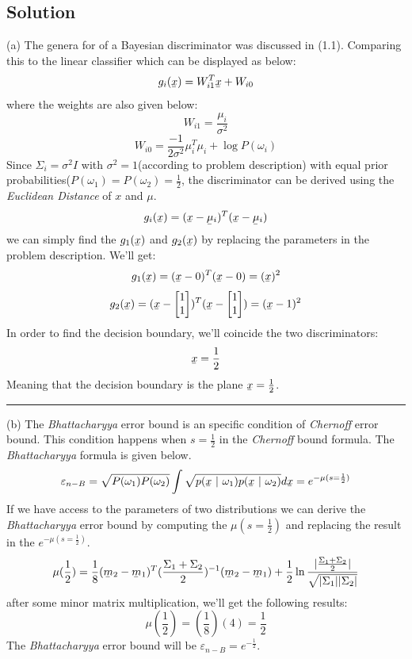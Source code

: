 \documentclass[12pt]{article}
\numberwithin{equation}{section}
\numberwithin{table}{section}
\numberwithin{figure}{section}
\newcommand{\eps}{\varepsilon}
\begin{document}
\subsection*{Solution}
(a) The genera for of a Bayesian discriminator was discussed in (1.1). Comparing this to the linear classifier which can be displayed as below:
$$
	g_i(\underaccent{\bar}{x}) = W_{i1}^T\underaccent{\bar}{x} + W_{i0}
$$
where the weights are also given below:\\
$$
	W_{i1} = \frac{\mu_i}{\sigma^2}
$$
$$
	W_{i0} = \frac{-1}{2\sigma^2}\mu_{i}^T\mu_{i} + \log P(\omega_i)
$$
Since $\Sigma_i = \sigma^2I$ with $\sigma^2 = 1$(according to problem description) with equal prior probabilities($P(\omega_1) = P(\omega_2) = \frac{1}{2}$, the discriminator can be derived using the \textit{Euclidean Distance} of $x$ and $\mu$.
$$
	g_i(\underaccent{\bar}{x}) = (\underaccent{\bar}{x} - \underaccent{\bar}{\mu}_i)^T (\underaccent{\bar}{x} - \underaccent{\bar}{\mu}_i)
$$
we can simply find the $g_1(\underaccent{\bar}{x})$ and $g_2(\underaccent{\bar}{x})$ by replacing the parameters in the problem description. We'll get:
$$
	g_1(\underaccent{\bar}{x}) = (\underaccent{\bar}{x} - 0)^T(\underaccent{\bar}{x} - 0) = (\underaccent{\bar}{x})^2
$$	
$$
	g_2(\underaccent{\bar}{x}) = (\underaccent{\bar}{x} - \begin{bmatrix}
	1\\
	1\\
	\end{bmatrix})^T(\underaccent{\bar}{x} - \begin{bmatrix}
	1\\
	1\\
	\end{bmatrix}) = (\underaccent{\bar}{x} - 1)^2
$$	
In order to find the decision boundary, we'll coincide the two discriminators:
$$
	\underaccent{\bar}{x} = \frac{1}{2}
$$
Meaning that the decision boundary is the plane $\underaccent{\bar}{x} = \frac{1}{2}$.

\noindent\rule{\textwidth}{.5pt}
(b) The \textit{Bhattacharyya} error bound is an specific condition of \textit{Chernoff} error bound. This condition happens when $s = \frac{1}{2}$ in the \textit{Chernoff} bound formula. The \textit{Bhattacharyya} formula is given below.
\begin{equation}
	\eps_{n-B} = \sqrt{P(\omega_1) P(\omega_2)} \int \sqrt{p(\underaccent{\bar}{x}\ |\ \omega_1)p(\underaccent{\bar}{x}\ |\ \omega_2)}d\underaccent{\bar}{x} = e^{-\mu(s = \frac{1}{2})}
\end{equation}
If we have access to the parameters of two distributions we can derive the \textit{Bhattacharyya} error bound by computing the $\mu(s = \frac{1}{2})$ and replacing the result in the $e^{-\mu(s = \frac{1}{2})}$.
$$
	\mu(\frac{1}{2}) = \frac{1}{8}(\underaccent{\bar}{m}_2 - \underaccent{\bar}{m}_1)^T(\frac{\Sigma_1 + \Sigma_2}{2})^{-1}(\underaccent{\bar}{m}_2 - \underaccent{\bar}{m}_1) + \frac{1}{2}\ln \frac{|\frac{\Sigma_1 + \Sigma_2}{2}|}{\sqrt{|\Sigma_1| |\Sigma_2|}}
$$
after some minor matrix multiplication, we'll get the following results:
$$
	\mu(\frac{1}{2}) = (\frac{1}{8})(4) = \frac{1}{2}
$$
The \textit{Bhattacharyya} error bound will be $\eps_{n-B} = e^{-\frac{1}{2}}$.
\end{document}
